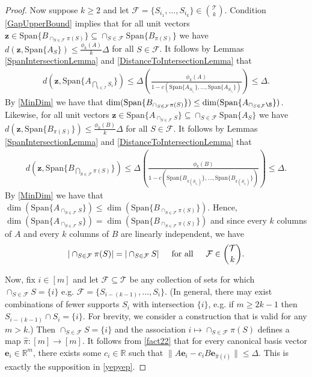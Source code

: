\documentclass[journal, onecolumn]{IEEEtran}
\begin{document}
\begin{proof}
Now suppose $k \geq 2$ and let $\mathcal{F} = \{S_{i_1}, \ldots, S_{i_k}\} \in {\mathcal{T} \choose k}$. Condition \eqref{GapUpperBound} implies that for all unit vectors $\mathbf{z} \in  \text{Span}\{B_{\cap_{S \in \mathcal{F}}\pi(S)}\} \subseteq \cap_{S \in \mathcal{F}} \text{Span}\{B_{\pi(S)}\}$ we have $d(\mathbf{z}, \text{Span}\{A_{S}\}) \leq \frac{\phi_k(A)}{k} \Delta$ for all $S \in \mathcal{F}$. It follows by Lemmas  \ref{SpanIntersectionLemma} and \ref{DistanceToIntersectionLemma} that 
\begin{align}
d\left( \mathbf{z}, \text{Span}\{A_{\bigcap_{i \in \mathcal{I}} S_{i}}\} \right) \leq \Delta \left( \frac{\phi_k(A)}{1 - c(\text{Span}\{A_{S_{i_1}}\}, \ldots, \text{Span}\{A_{S_{i_\ell}}\})} \right) \leq \Delta.
\end{align}
%
By \eqref{MinDim} we have that $\dim(\text{Span}\{B_{\cap_{S \in \mathcal{F}}\pi(S)}\}) \leq \dim(\text{Span}\{A_{\cap_{S \in \mathcal{F}}\S}\})$.
Likewise, for all unit vectors $\mathbf{z} \in  \text{Span}\{A_{\cap_{S \in \mathcal{F}} S}\} \subseteq \cap_{S \in \mathcal{F}} \text{Span}\{A_S\}$ we have $d(\mathbf{z}, \text{Span}\{B_{\pi(S)}\}) \leq \frac{\phi_k(B)}{k} \Delta$ for all $S \in \mathcal{F}$. It follows by Lemmas  \ref{SpanIntersectionLemma} and \ref{DistanceToIntersectionLemma} that 
\begin{align}\label{fact12}
d\left( \mathbf{z}, \text{Span}\{B_{\bigcap_{S \in \mathcal{F}} \pi(S)}\} \right) \leq \Delta \left( \frac{\phi_k(B)}{1 - c(\text{Span}\{B_{\pi(S_{i_1})}\}, \ldots, \text{Span}\{B_{\pi(S_{i_\ell})}\})} \right) \leq \Delta.
\end{align}
By \eqref{MinDim} we have that $\dim(\text{Span}\{A_{\cap_{S \in \mathcal{F}}S}\}) \leq \dim(\text{Span}\{B_{\cap_{S \in \mathcal{F}}\pi(S)}\})$. Hence, $\dim(\text{Span}\{A_{\cap_{S \in \mathcal{F}}S}\}) = \dim(\text{Span}\{B_{\cap_{S \in \mathcal{F}}\pi(S)}\})$ and since every $k$ columns of $A$ and every $k$ columns of $B$ are linearly independent, we have
\begin{align}\label{fact22}
|\cap_{S \in \mathcal{F}} \pi(S)| = |\cap_{S \in \mathcal{F}} S | \indent \text{for all} \indent \mathcal{F} \in {\mathcal{T} \choose k}.
\end{align}

Now, fix $i \in [m]$ and let $\mathcal{F} \subseteq \mathcal{T}$ be any collection of sets for which $\cap_{S \in \mathcal{F}} S = \{i\}$ e.g. $\mathcal{F} = \{S_{i-(k-1)}, \ldots, S_i\}$. (In general, there may exist combinations of fewer supports $S_i$ with intersection $\{i\}$, e.g. if $m \geq 2k-1$ then $S_{i - (k-1)} \cap S_i = \{i\}$. For brevity, we consider a construction that is valid for any $m > k$.) Then $\cap_{S \in \mathcal{F}} S = \{i\}$ and the association $i \mapsto \cap_{S \in \mathcal{F}} \pi(S)$ defines a map $\hat \pi: [m] \to [m]$. It follows from \eqref{fact22} that for every canonical basis vector $\mathbf{e}_i \in \mathbb{R}^m$, there exists some $c_i \in \mathbb{R}$ such that $\|A\mathbf{e}_i - c_iB\mathbf{e}_{\hat \pi(i)}\| \leq \Delta$. This is exactly the supposition in \eqref{yepyep}.
\end{proof}
\end{document}
